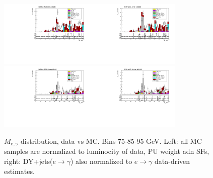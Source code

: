 \begin{figure}[htb]
\begin{center}
    \includegraphics[width=0.40\textwidth]{../figs/figs_v11/ELECTRON_WGamma/PrepareYields/c_TotalDATAvsMC_Barrel__Mpholep1PRELIMINARY_FOR_E_TO_GAMMA_WITH_PSV_CUT_pt85to95_.pdf}\includegraphics[width=0.40\textwidth]{../figs/figs_v11/ELECTRON_WGamma/PrepareYields/c_TotalDATAvsMC_Barrel__Mpholep1PRELIMINARY_FOR_E_TO_GAMMA_WITH_PSV_CUT_pt85to95__etogScale.pdf}\\ 
    \includegraphics[width=0.40\textwidth]{../figs/figs_v11/ELECTRON_WGamma/PrepareYields/c_TotalDATAvsMC_Endcap__Mpholep1PRELIMINARY_FOR_E_TO_GAMMA_WITH_PSV_CUT_pt85to95_.pdf}\includegraphics[width=0.40\textwidth]{../figs/figs_v11/ELECTRON_WGamma/PrepareYields/c_TotalDATAvsMC_Endcap__Mpholep1PRELIMINARY_FOR_E_TO_GAMMA_WITH_PSV_CUT_pt85to95__etogScale.pdf}\\
   \label{fig:Mpholep1DatavsMC_75to500}
  \caption{$M_{e,\gamma}$ distribution, data vs MC. Bins 75-85-95 GeV. Left: all MC samples are normalized to luminocity of data, PU weight adn SFs, right: DY+jets($e\rightarrow\gamma$) also normalized to $e\rightarrow\gamma$ data-driven estimates.}
  \end{center}
\end{figure}

